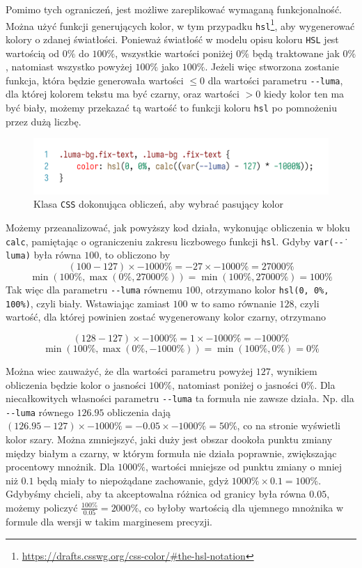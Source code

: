 \documentclass[licencjacka]{pracadypl}
\begin{document}
Pomimo tych ograniczeń, jest możliwe zareplikować wymaganą funkcjonalność. Można użyć funkcji generujących kolor, w tym przypadku \texttt{hsl}\footnote{\url{https://drafts.csswg.org/css-color/\#the-hsl-notation}}, aby wygenerować kolory o zdanej światłości. Ponieważ światłość w modelu opisu koloru \texttt{HSL} jest wartością od $0\%$ do $100\%$, wszystkie wartości poniżej $0\%$ będą traktowane jak $0\%$, natomiast wszystko powyżej $100\%$ jako $100\%$. Jeżeli więc stworzona zostanie funkcja, która będzie generowała wartości $\leq 0$ dla wartości parametru \texttt{-\.-luma}, dla której kolorem tekstu ma być czarny, oraz wartości $> 0$ kiedy kolor ten ma być biały, możemy przekazać tą wartość to funkcji koloru \texttt{hsl} po pomnożeniu przez dużą liczbę.

\begin{figure}[H]
  \centering
  \includegraphics[width=\linewidth]{images/code-css-luma-calc.png}
  \caption{Klasa \texttt{CSS} dokonująca obliczeń, aby wybrać pasujący kolor}
  \label{fig:css-css-luma-calc}
\end{figure}

Możemy przeanalizować, jak powyższy kod działa, wykonując obliczenia w bloku \texttt{calc}, pamiętając o ograniczeniu zakresu liczbowego funkcji \texttt{hsl}. Gdyby \texttt{var(-\.-luma)} była równa $100$, to obliczono by
\[
  \left(100-127\right) \times -1000\% = -27 \times -1000\% = 27000\%
\]
\[
  \min\left(100\%, \max\left(0\%, 27000\%\right)\right) = \min\left(100\%, 27000\%\right) = 100\%
\]
Tak więc dla parametru \texttt{-\.-luma} równemu $100$, otrzymano kolor \texttt{hsl(0, 0\%, 100\%)}, czyli biały. Wstawiając zamiast $100$ w to samo równanie $128$, czyli wartość, dla której powinien zostać wygenerowany kolor czarny, otrzymano

\[
  \left(128-127\right) \times -1000\% = 1 \times -1000\% = -1000\%
\]
\[
  \min\left(100\%, \max\left(0\%, -1000\%\right)\right) = \min\left(100\%, 0\%\right) = 0\%
\]

Można wiec zauważyć, że dla wartości parametru powyżej $127$, wynikiem obliczenia będzie kolor o jasności $100\%$, natomiast poniżej o jasności $0\%$. Dla niecałkowitych własności parametru \texttt{-\.-luma} ta formuła nie zawsze działa. Np. dla \texttt{-\.-luma} równego $126.95$ obliczenia dają $\left(126.95-127\right)\times-1000\% = -0.05 \times -1000\% = 50\%$, co na stronie wyświetli kolor szary. Można zmniejszyć, jaki duży jest obszar dookoła punktu zmiany między białym a czarny, w którym formuła nie działa poprawnie, zwiększając procentowy mnożnik. Dla $1000\%$, wartości mniejsze od punktu zmiany o mniej niż $0.1$ będą miały to niepożądane zachowanie, gdyż $1000\%\times0.1 = 100\%$. Gdybyśmy chcieli, aby ta akceptowalna różnica od granicy była równa $0.05$, możemy policzyć $\frac{100\%}{0.05} = 2000\%$, co byłoby wartością dla ujemnego mnożnika w formule dla wersji w takim marginesem precyzji.
\end{document}
